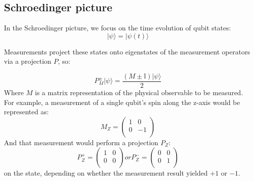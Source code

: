 \subsection{Schroedinger picture}
In the Schroedinger picture, we focus on the time evolution of qubit states:
\begin{equation}  
	|\psi\rangle = |\psi(t)\rangle 
\end{equation}

Measurements project these states onto eigenstates of the measurement operators via
a projection $P$, so:

\begin{equation}
    P_M^{\pm} |\psi\rangle = \frac{(M\pm \mathbb{I})|\psi\rangle}{2}
\end{equation}
Where $M$ is a matrix representation of the physical observable
 to be measured.
For example, a measurement of a single qubit's spin along the z-axis would be
represented as:
\begin{equation}
    M_Z = \left(
        \begin{array}{cc}
            1 & 0 \\
            0 & -1 \\
        \end{array}
        \right)
\end{equation}
And that measurement would perform a projection $P_Z$:
\begin{equation}
    P_Z^+ = \left(
        \begin{array}{cc}
            1 & 0 \\
            0 & 0 \\
        \end{array}
        \right)
    or
    P_Z^- = \left(
        \begin{array}{cc}
            0 & 0 \\
            0 & 1 \\
        \end{array}
        \right)
\end{equation}
on the state, depending on whether the measurement result yielded $+1$ or $-1$.

